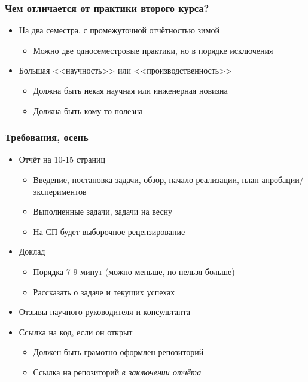 \documentclass{../../slides-style}
\begin{document}
    
    \begin{frame}[plain]
        \titlepage
    \end{frame}

    \begin{frame}
        \frametitle{Чем отличается от практики второго курса?}
        \begin{itemize}
            \item На два семестра, с промежуточной отчётностью зимой
            \begin{itemize}
                \item Можно две односеместровые практики, но в порядке исключения
            \end{itemize}
            \item Большая <<научность>> или <<производственность>>
            \begin{itemize}
                \item Должна быть некая научная или инженерная новизна
                \item Должна быть кому-то полезна
            \end{itemize}
        \end{itemize}
    \end{frame}

    \begin{frame}
        \frametitle{Требования, осень}
        \begin{itemize}
            \item Отчёт на 10-15 страниц
            \begin{itemize}
                \item Введение, постановка задачи, обзор, начало реализации, план апробации/экспериментов
                \item Выполненные задачи, задачи на весну
                \item На СП будет выборочное рецензирование
            \end{itemize}
            \item Доклад
            \begin{itemize}
                \item Порядка 7-9 минут (можно меньше, но нельзя больше)
                \item Рассказать о задаче и текущих успехах
            \end{itemize}
            \item Отзывы научного руководителя и консультанта
            \item Ссылка на код, если он открыт
            \begin{itemize}
                \item Должен быть грамотно оформлен репозиторий
                \item Ссылка на репозиторий \emph{в заключении отчёта}
            \end{itemize}
        \end{itemize}
    \end{frame}
\end{document}
